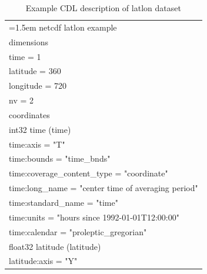 \begin{longtable}{|p{\textwidth}|}
\caption{Example CDL description of latlon dataset}
\label{tab:cdl-latlon} \\
\hline \endhead
\hline \endfoot
\hangindent=1.5em\hangafter=1
netcdf latlon example\\
dimensions\\
\hline
\rowcolor{YellowGreen}  time = 1\\
\rowcolor{YellowGreen}  latitude = 360\\
\rowcolor{YellowGreen}  longitude = 720\\
\rowcolor{YellowGreen}  nv = 2\\
\hline

coordinates\\
\hline
\rowcolor{Apricot}\hspace{0.5cm}int32 time (time)\\
\rowcolor{Apricot}\hspace{0.5cm}\hspace{0.5cm}time:axis = "T"\\
\rowcolor{Apricot}\hspace{0.5cm}\hspace{0.5cm}time:bounds = "time\_bnds"\\
\rowcolor{Apricot}\hspace{0.5cm}\hspace{0.5cm}time:coverage\_content\_type = "coordinate"\\
\rowcolor{Apricot}\hspace{0.5cm}\hspace{0.5cm}time:long\_name = "center time of averaging period"\\
\rowcolor{Apricot}\hspace{0.5cm}\hspace{0.5cm}time:standard\_name = "time"\\
\rowcolor{Apricot}\hspace{0.5cm}\hspace{0.5cm}time:units = "hours since 1992-01-01T12:00:00"\\
\rowcolor{Apricot}\hspace{0.5cm}\hspace{0.5cm}time:calendar = "proleptic\_gregorian"\\
\rowcolor{Apricot}\hspace{0.5cm}float32 latitude (latitude)\\
\rowcolor{Apricot}\hspace{0.5cm}\hspace{0.5cm}latitude:axis = "Y"\\

\end{longtable}
